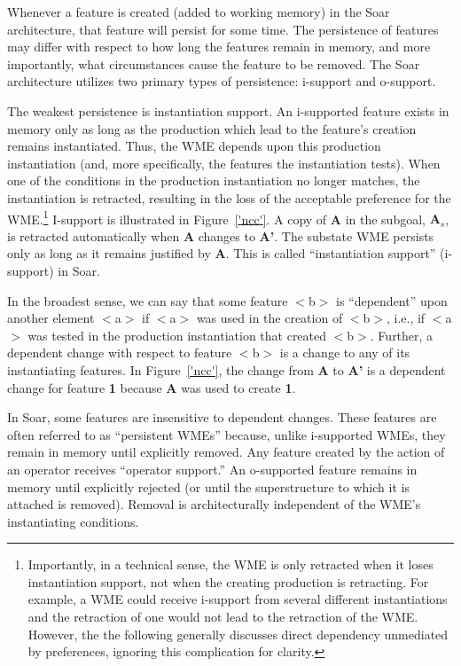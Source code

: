 Whenever a feature is created (added to working memory) in the Soar
architecture, that feature will persist for some time.  The
persistence of features may differ with respect to how long the
features remain in memory, and more importantly, what circumstances
cause the feature to be removed.  The Soar architecture utilizes
two primary types of persistence: i-support and o-support.

The weakest persistence is instantiation support. An i-supported
feature exists in memory only as long as the production which lead to
the feature's creation remains instantiated. Thus, the WME depends
upon this production instantiation (and, more specifically, the
features the instantiation tests). When one of the conditions in the
production instantiation no longer matches, the instantiation is
retracted, resulting in the loss of the acceptable preference for the
WME.\footnote{Importantly, in a technical sense, the WME is only
	retracted when it loses instantiation support, not when the creating
	production is retracting.  For example, a WME could receive i-support
	from several different instantiations and the retraction of one would
	not lead to the retraction of the WME.  However, the the following
	generally discusses direct dependency unmediated by preferences,
	ignoring this complication for clarity.}  I-support is illustrated in
Figure~\ref{'ncc'}. A copy of {\bf A} in the subgoal, {\bf A$_s$}, is
retracted automatically when {\bf A} changes to {\bf A'}.  The
substate WME persists only as long as it remains justified by {\bf A}.
This is called ``instantiation support'' (i-support) in
Soar.

In the broadest sense, we can say that some feature $<$b$>$ is
``dependent'' upon another element $<$a$>$ if $<$a$>$ was used in the
creation of $<$b$>$, i.e., if $<$a$>$ was tested in the production
instantiation that created $<$b$>$. Further, a dependent change with
respect to feature $<$b$>$ is a change to any of its instantiating
features.  In Figure~\ref{'ncc'}, the change from {\bf A} to {\bf A'}
is a dependent change for feature {\bf 1} because {\bf A} was used to
create {\bf 1}.

In Soar, some features are insensitive to dependent changes. These
features are often referred to as ``persistent WMEs'' because, unlike
i-supported WMEs, they remain in memory until explicitly removed. Any feature created by the action of an operator
receives ``operator support.'' An o-supported feature remains in
memory until explicitly rejected (or until the superstructure to which
it is attached is removed). Removal is architecturally
independent of the WME's instantiating conditions.

